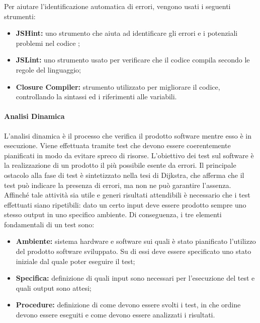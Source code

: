 Per aiutare l'identificazione automatica di errori, vengono usati i seguenti strumenti:
\begin{itemize}
\item \textbf{JSHint: }uno strumento che aiuta ad identificare gli errori e i potenziali problemi nel codice ;
\item \textbf{JSLint: }uno strumento usato per verificare che il codice  compila secondo le regole del linguaggio;
\item \textbf{Closure Compiler: }strumento utilizzato per  migliorare il codice, controllando la sintassi ed i riferimenti alle variabili.
\end{itemize}

\paragraph{Analisi Dinamica}
    L'analisi dinamica è il processo che verifica il prodotto software mentre esso è in esecuzione. Viene effettuata tramite test che devono essere coerentemente pianificati in modo da evitare spreco di risorse.
    L'obiettivo dei test sul software è la realizzazione di un prodotto il più possibile esente da errori. Il principale ostacolo alla fase di test è sintetizzato nella tesi di Dijkstra, che afferma che il test può indicare la presenza di errori, ma non ne può garantire l'assenza.
Affinché tale attività sia utile e generi risultati attendibili è necessario che i test effettuati
siano ripetibili: dato un certo input deve essere prodotto sempre uno stesso output in
uno specifico ambiente. Di conseguenza, i tre elementi fondamentali di un test sono:
    \begin{itemize}
    \item \textbf{Ambiente: }sistema hardware e software sui quali è stato pianificato l'utilizzo del
prodotto software sviluppato. Su di essi deve essere specificato uno stato iniziale
dal quale poter eseguire il test;
    \item \textbf{Specifica: }definizione di quali input sono necessari per l'esecuzione del test e quali output sono attesi;
    \item \textbf{Procedure: }definizione di come devono essere svolti i test, in che ordine devono
essere eseguiti e come devono essere analizzati i risultati.
    \end{itemize}


